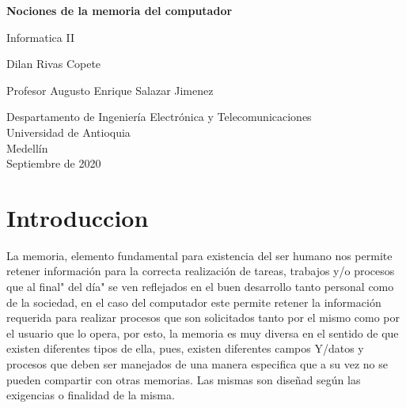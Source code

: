 \documentclass{article}
\begin{document}
\begin{titlepage}
    \begin{center}
        \vspace*{1cm}
            
        \Huge
        \textbf{Nociones de la memoria del computador }
            
        \vspace{0.5cm}
        \LARGE
       Informatica II
            
        \vspace{1.5cm}
            
        {Dilan Rivas Copete }
        
        \vspace{0.5cm}
        
        {Profesor Augusto Enrique Salazar Jimenez}        
            
        \vfill
            
        \vspace{0.8cm}
            
        \Large
        Despartamento de Ingeniería Electrónica y Telecomunicaciones\\
        Universidad de Antioquia\\
        Medellín\\
        Septiembre de 2020
            
    \end{center}
\end{titlepage}
\tableofcontents

\newpage

\section{Introduccion}
{\raggedright
La  memoria, elemento fundamental para existencia del ser humano nos permite retener información para la correcta realización de tareas, trabajos y/o procesos que al final" del día" se ven reflejados en el buen desarrollo tanto personal como de la  sociedad, en el caso del computador este permite retener la información requerida para realizar procesos que son solicitados tanto por el mismo como por el usuario que lo opera, por esto, la memoria es muy diversa en el sentido de que existen diferentes tipos de ella, pues, existen diferentes campos Y/datos y procesos que deben ser manejados de una manera especifica  que a su vez no se pueden compartir con otras memorias. Las mismas son diseñad según las exigencias o finalidad de la misma.}
\end{document}

